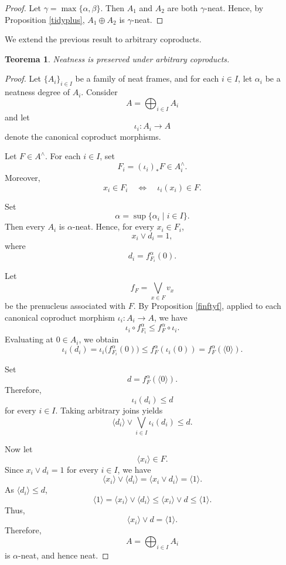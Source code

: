 \documentclass[11pt]{amsart}
\theoremstyle{plain}
\newtheorem{thm}{Teorema}[section]
\theoremstyle{definition}
\begin{document}
\begin{proof}
Let $\gamma=\max\{\alpha, \beta\}$. Then $A_1$ and $A_2$ are both $\gamma$-neat. Hence, by Proposition \ref{tidyplus}, $A_1\oplus A_2$ is $\gamma$-neat.
\end{proof}

We extend the previous result to arbitrary coproducts.

\begin{thm}\label{coprodE}
Neatness is preserved under arbitrary coproducts.
\end{thm}

\begin{proof}
Let \(\{A_i\}_{i\in I}\) be a family of neat frames, and for each
\(i\in I\), let \(\alpha_i\) be a neatness degree of \(A_i\). Consider
\[
    A=\bigoplus_{i\in I}A_i
\]
and let
\[
    \iota_i\colon A_i\longrightarrow A
\]
denote the canonical coproduct morphisms.

Let \(F\in A^\wedge\). For each \(i\in I\), set
\[
    F_i=(\iota_i)_*F\in A_i^\wedge.
\]
Moreover,
\[
    x_i\in F_i
    \quad\Longleftrightarrow\quad
    \iota_i(x_i)\in F.
\]

Set
\[
    \alpha=\sup\{\alpha_i\mid i\in I\}.
\]
Then every \(A_i\) is \(\alpha\)-neat. Hence, for every
\(x_i\in F_i\),
\[
    x_i\vee d_i=1,
\]
where
\[
    d_i=f_{F_i}^{\alpha}(0).
\]

Let
\[
    f_F=\bigvee_{x\in F}v_x
\]
be the prenucleus associated with \(F\). By Proposition \ref{finftyf}, applied
to each canonical coproduct morphism
\(\iota_i\colon A_i\to A\), we have
\[
    \iota_i\circ f_{F_i}^{\alpha}
    \leq
    f_F^{\alpha}\circ\iota_i.
\]
Evaluating at \(0\in A_i\), we obtain
\[
    \iota_i(d_i)
    =
    \iota_i\bigl(f_{F_i}^{\alpha}(0)\bigr)
    \leq
    f_F^{\alpha}(\iota_i(0))
    =
    f_F^{\alpha}(\langle0\rangle).
\]

Set
\[
    d=f_F^{\alpha}(\langle0\rangle).
\]
Therefore,
\[
    \iota_i(d_i)\leq d
\]
for every \(i\in I\). Taking arbitrary joins yields
\[
    \langle d_i\rangle
    \vee
    \bigvee_{i\in I}\iota_i(d_i)
    \leq d.
\]

Now let
\[
    \langle x_i\rangle\in F.
\]
Since \(x_i\vee d_i=1\) for every \(i\in I\), we have
\[
    \langle x_i\rangle\vee\langle d_i\rangle
    =
    \langle x_i\vee d_i\rangle
    =
    \langle1\rangle.
\]
As \(\langle d_i\rangle\leq d\),
\[
    \langle1\rangle
    =
    \langle x_i\rangle\vee\langle d_i\rangle
    \leq
    \langle x_i\rangle\vee d
    \leq
    \langle1\rangle.
\]
Thus,
\[
    \langle x_i\rangle\vee d=\langle1\rangle.
\]
Therefore,
\[
    A=\bigoplus_{i\in I}A_i
\]
is \(\alpha\)-neat, and hence neat.
\end{proof} 
\end{document}
